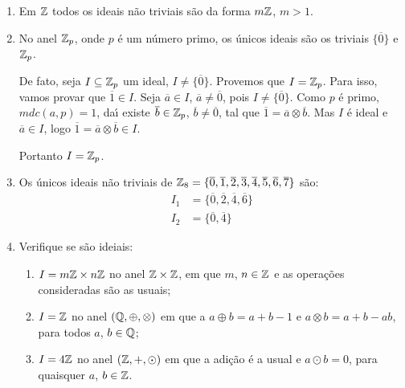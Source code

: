 \begin{exemplo}
    \begin{enumerate}[label={\arabic*})]
		\item Em $\mathbb{Z}$ todos os ideais n{\~a}o triviais s{\~a}o da forma $m\mathbb{Z}$, $m > 1$.
		\item No anel $\mathbb{Z}_p$, onde $p$ {\'e} um n{\'u}mero primo, os {\'u}nicos ideais  s{\~a}o os triviais $\{\overline{0}\}$ e $\mathbb{Z}_p$.

		De fato, seja $I \subseteq \mathbb{Z}_p$ um ideal, $I \neq \{\overline{0}\}$. Provemos que $I = \mathbb{Z}_p$. Para isso,
		vamos provar que $\overline{1} \in I$. Seja $\overline{a} \in I$, $\overline{a} \neq \overline{0}$, pois $I \neq \{\overline{0}\}$. Como $p$ {\'e} primo, $mdc(a,p) = 1$, da{\'\i} existe $\overline{b} \in \mathbb{Z}_p$, $\overline{b} \neq \overline{0}$, tal que $\overline{1} = \overline{a} \otimes \overline{b}$. Mas $I$ {\'e} ideal e $\overline{a} \in I$, logo $\overline{1} = \overline{a} \otimes \overline{b} \in I$.

		Portanto $I = \mathbb{Z}_p$.

		\item Os {\'u}nicos ideais n{\~a}o triviais de $\mathbb{Z}_8 = \{\overline{0}, \overline{1}, \overline{2}, \overline{3}, \overline{4}, \overline{5}, \overline{6}, \overline{7}\}$ s{\~a}o:
		\begin{align*}
			I_1 &= \{\overline{0}, \overline{2}, \overline{4}, \overline{6}\}\\
			I_2 &=\{\overline{0}, \overline{4}\}
		\end{align*}

        \item Verifique se s\~ao ideiais:
            \begin{enumerate}[label=({\alph*})]
                \item $I = m\mathbb{Z} \times n\mathbb{Z}$ no anel $\mathbb{Z} \times \mathbb{Z}$, em que $m$, $n \in \mathbb{Z}$ e as operações consideradas são as usuais;

                \item $I = \mathbb{Z}$ no anel $(\mathbb{Q}, \oplus, \otimes)$ em que a $a \oplus b = a + b - 1$ e $a \otimes b = a + b - ab$, para todos $a$, $b \in \mathbb{Q}$;

            \item $I = 4\mathbb{Z}$ no anel $(\mathbb{Z}, +, \odot)$ em que a adi\c{c}\~ao \'e a usual e $a \odot b = 0$, para quaisquer $a$, $b \in \mathbb{Z}$.
        \end{enumerate}
    \end{enumerate}
\end{exemplo}

